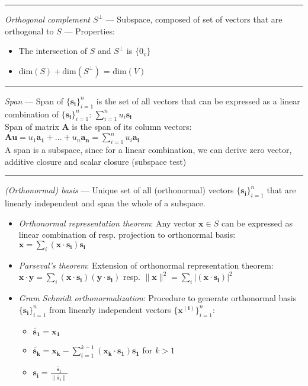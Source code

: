{\color{lightgray}\hrule height 0.001mm}

\emph{Orthogonal complement $S^{\bot}$} --- Subspace, composed of set of vectors that are orthogonal to $S$ --- Properties:
\begin{multicols}{2}
\begin{itemize}
    \item The intersection of $S$ and $S^{\bot}$ is $\{0_v\}$
    \item $\textrm{dim}(S) + \textrm{dim}(S^{\bot})$ = $\textrm{dim}(V)$
\end{itemize}
\end{multicols}

{\color{lightgray}\hrule height 0.001mm}

\emph{Span} --- Span of $\{\boldsymbol{s_i}\}_{i=1}^n$ is the set of all vectors that can be expressed as a linear combination of $\{\boldsymbol{s_i}\}_{i=1}^n$:
$\sum_{i=1}^n u_i \boldsymbol{s_i}$
\\
Span of matrix $\boldsymbol{A}$ is the span of its column vectors:
$\boldsymbol{A}\boldsymbol{u} = u_1 \boldsymbol{a_1} + ... + u_n \boldsymbol{a_n} = \sum_{i=1}^n u_i \boldsymbol{a_i}$
\\
A span is a subspace, since for a linear combination, we can derive zero vector, additive closure and scalar closure (subspace test)

{\color{lightgray}\hrule height 0.001mm}

\emph{(Orthonormal) basis} --- Unique set of all (orthonormal) vectors $\{\boldsymbol{s_i}\}_{i=1}^n$ that are linearly independent and span the whole of a subspace.
\begin{itemize}
    \item \emph{Orthonormal representation theorem}: Any vector $\boldsymbol{x} \in S$ can be expressed as linear combination of resp. projection to orthonormal basis: $\boldsymbol{x} = \sum_i (\boldsymbol{x} \cdot \boldsymbol{s_i})\boldsymbol{s_i}$
    \item \emph{Parseval's theorem}: Extension of orthonormal representation theorem: $\boldsymbol{x} \cdot \boldsymbol{y} = \sum_i (\boldsymbol{x} \cdot \boldsymbol{s_i})(\boldsymbol{y} \cdot \boldsymbol{s_i})$ resp. $\| \boldsymbol{x} \|^2 = \sum_i | (\boldsymbol{x} \cdot \boldsymbol{s_i}) |^2$
    \item \emph{Gram Schmidt orthonormalization}: Procedure to generate orthonormal basis $\{\boldsymbol{s_i}\}_{i=1}^n$ from linearly independent vectors $\{\boldsymbol{x^{(i)}}\}_{i=1}^n$:
    \begin{itemize}
        \item $\boldsymbol{\tilde{s_1}} = \boldsymbol{x_1}$
        \item $\boldsymbol{\tilde{s_k}} = \boldsymbol{x_k} - \sum_{i=1}^{k-1} (\boldsymbol{x_k} \cdot \boldsymbol{s_1})\boldsymbol{s_1}$ for $k > 1$
        \item $\boldsymbol{s_i} = \frac{\boldsymbol{\tilde{s_i}}}{\|\boldsymbol{\tilde{s_i}}\|}$
    \end{itemize}    
\end{itemize}

